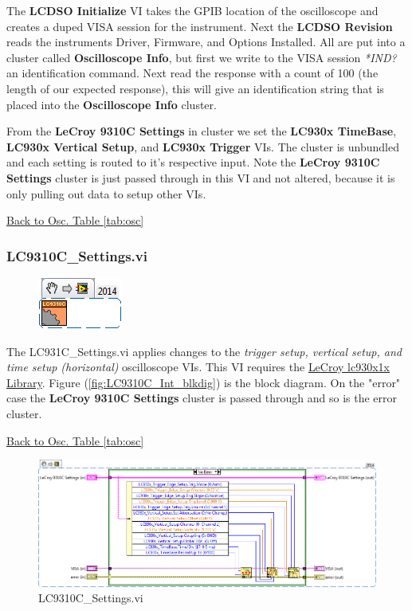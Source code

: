 \documentclass[11pt,a4paper,oldfontcommands]{memoir}
\begin{document}
The \textbf{LCDSO Initialize} VI takes the GPIB location of the oscilloscope and creates a duped VISA session for the instrument. Next the \textbf{LCDSO Revision} reads the instruments Driver, Firmware, and Options Installed. All are put into a cluster called \textbf{Oscilloscope Info}, but first we write to the VISA session \textit{*IND?} an identification command. Next read the response with a count of 100 (the length of our expected response), this will give an identification string that is placed into the \textbf{Oscilloscope Info} cluster.

From the \textbf{LeCroy 9310C Settings} in cluster we set the \textbf{LC930x TimeBase}, \textbf{LC930x Vertical Setup}, and \textbf{LC930x Trigger} VIs. The cluster is unbundled and each setting is routed to it's respective input. Note the \textbf{LeCroy 9310C Settings} cluster is just passed through in this VI and not altered, because it is only pulling out data to setup other VIs.

\noindent\hrulefill \hyperref[tab:osc]{Back to Osc. Table \ref{tab:osc}}

\newpage

\subsubsection{LC9310C\_Settings.vi}

\noindent\hrulefill

\begin{figure}[H]
	\includegraphics[scale=0.625]{LC931C_settings_main_01}
	\label{fig:LC9310C_settings_main_01}
\end{figure}

The LC931C\_Settings.vi applies changes to the \textit{trigger setup, vertical setup, and time setup (horizontal)} oscilloscope VIs. This VI requires the \href{http://sine.ni.com/apps/utf8/niid_web_display.download_page?p_id_guid=E3B19B3E9608659CE034080020E74861}{LeCroy lc930x1x Library}. Figure (\ref{fig:LC9310C_Int_blkdig}) is the block diagram. On the "error" case the \textbf{LeCroy 9310C Settings} cluster is passed through and so is the error cluster.

\noindent\hrulefill \hyperref[tab:osc]{Back to Osc. Table \ref{tab:osc}}

\begin{figure}[H]
	\includegraphics[width=\textwidth,keepaspectratio]{LC931C_settings_blockdiagram_01}
	\caption{LC9310C\_Settings.vi}
	\label{fig:LC9310C_settings_blkdig_01}
\end{figure}
\end{document}
